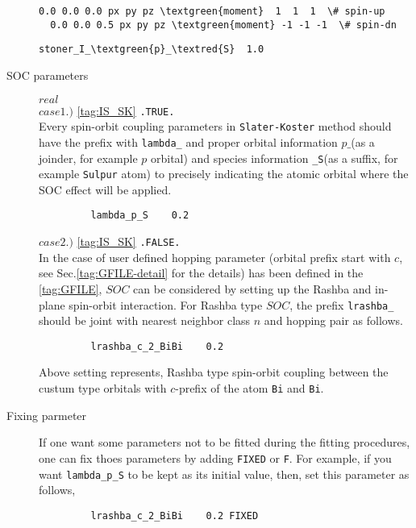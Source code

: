 \documentclass[a4paper,12pt]{scrartcl}
\makeatletter
\def\namedlabel#1#2{\begingroup
    #2%
    \def\@currentlabel{#2}%
    \phantomsection\label{#1}\endgroup
}
\newcommand{\textred}[1]{\textcolor{red!85!white}{\texttt{#1}}}
\newcommand{\textgreen}[1]{\textcolor{green!50!black}{\texttt{#1}}}
\makeatother
\begin{document}
\begin{description}
\begin{Verbatim}[commandchars=\\\{\},gobble=4, frame=single, framesep=2mm, 
    label= example of \textgreen{moment} tag in \ref{tag:GFILE},
    labelposition=bottomline]
  0.0 0.0 0.0 px py pz \textgreen{moment}  1  1  1  \# spin-up
  0.0 0.0 0.5 px py pz \textgreen{moment} -1 -1 -1  \# spin-dn
\end{Verbatim}

\begin{Verbatim}[commandchars=\\\{\},gobble=4, frame=single, framesep=2mm, 
    label= example of \textgreen{stoner} parameter  in \ref{tag:PFILE},
    labelposition=bottomline]
    stoner_I_\textgreen{p}_\textred{S}  1.0
\end{Verbatim}


    \item[\namedlabel{tag:param-soc}{SOC parameters}] $real$ \\
		\subitem $case 1.)$ \ref{tag:IS_SK} \texttt{.TRUE.} \\
       	Every spin-orbit coupling parameters in \texttt{Slater-Koster} method
		should have the prefix with \texttt{lambda\_} and proper orbital information 
		\texttt{$p\_$}(as a joinder, for example $p$ orbital) 
		and species information \texttt{\_S}(as a suffix, for example 
		\texttt{Sulpur} atom) to precisely indicating the 
		atomic orbital where the SOC effect will be applied.
        \begin{verbatim}
         lambda_p_S    0.2
        \end{verbatim}

        \subitem $case 2.)$ \ref{tag:IS_SK} \texttt{.FALSE.} \\
		In the case of user defined hopping parameter (orbital prefix start with $c$,
		see Sec.\ref{tag:GFILE-detail} for the details) has been defined in the 
		\ref{tag:GFILE}, $SOC$ can be considered by setting up the Rashba and in-plane
		spin-orbit interaction.
		For Rashba type $SOC$, the prefix \texttt{lrashba\_} should be joint with 
		nearest neighbor class $n$ and hopping pair as follows.
        \begin{verbatim}
         lrashba_c_2_BiBi    0.2
        \end{verbatim}
		Above setting represents, Rashba type spin-orbit coupling between the
		custum type orbitals with $c$-prefix of the atom \texttt{Bi} and \texttt{Bi}.

	\item[\namedlabel{tag:param-fix}{Fixing parmeter}] $ $ \\
		If one want some parameters not to be fitted during the fitting 
		procedures, one can fix thoes parameters by adding \texttt{FIXED} or 
		\texttt{F}.
		For example, if you want \texttt{lambda\_p\_S} to be kept as its initial 
		value, then, set this parameter as follows,
        \begin{verbatim}
         lrashba_c_2_BiBi    0.2 FIXED
        \end{verbatim}


\end{description}
\end{document}

